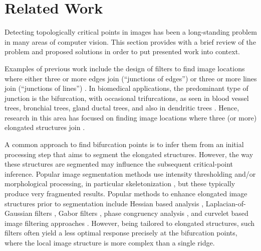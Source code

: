 \section{Related Work}
\label{sec:related-work}
Detecting topologically critical points in images has been a long-standing problem in many areas of computer vision. This section provides with a brief review of the problem and proposed solutions in order to put presented work into context.

Examples of previous work include the design of filters to find image locations where either three or more edges join (``junctions of edges'') \cite{sinzinger2008model, hansen2004neural, laganiere2004detection} or three or more lines join (``junctions of lines'') \cite{yu1998rotated, deschenes2000detection}. In biomedical applications, the predominant type of junction is the bifurcation, with occasional trifurcations, as seen in blood vessel trees, bronchial trees, gland ductal trees, and also in dendritic trees \cite{koene2009netmorph, iber2013control}. Hence, research in this area has focused on finding image locations where three (or more) elongated structures join \cite{tsai2004model, agam2005vessel, bevilacqua2005combined, bhuiyan2007automatic, zhou2007vascular, aibinu2010vascular, calvo2011automatic, obaraa2012contrast, su2012junction, azzopardi2013automatic}.

A common approach to find bifurcation points is to infer them from an initial processing step that aims to segment the elongated structures. However, the way these structures are segmented may influence the subsequent critical-point inference. Popular image segmentation methods use intensity thresholding and/or morphological processing, in particular skeletonization \cite{hoover2000locating, dima2002automatic, he2003automated, weaver2004automated, pool2008neuritetracer, bevilacqua2009comparison, leandro2009automatic, aibinu2010vascular}, but these typically produce very fragmented results. Popular methods to enhance elongated image structures prior to segmentation include Hessian based analysis \cite{frangi1998multiscale, xiong2006automated, zhang2007automated, al2008improved, yuan2009mdl, turetken2011automated, myatt2012neuromantic, basu2013segmentation, santamaria2015automatic}, Laplacian-of-Gaussian filters \cite{chothani2011automated}, Gabor filters \cite{bhuiyan2007automatic, azzopardi2013automatic}, phase congruency analysis \cite{obara2012contrast}, and curvelet based image filtering approaches \cite{narayanaswamy20113}. However, being tailored to elongated structures, such filters often yield a less optimal response precisely at the bifurcation points, where the local image structure is more complex than a single ridge.

